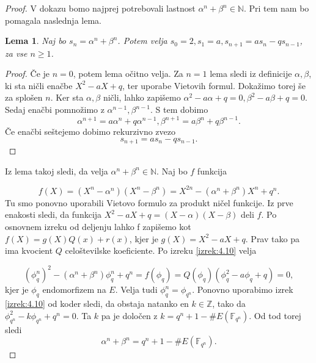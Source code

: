 \documentclass[12pt,a4paper,twoside]{article}
\theoremstyle{definition} %
\theoremstyle{plain} %
\newtheorem{lema}[definicija]{Lema}
\numberwithin{equation}{section}  %
\newcommand{\N}{\mathbb N}
\newcommand{\Z}{\mathbb Z}
\newcommand{\F}{\mathbb F}
\newcommand{\E}[1]{E({#1})}
\begin{document}
\begin{proof}
V dokazu bomo najprej potrebovali lastnost $\alpha^n+\beta^n \in \N$. Pri tem nam bo pomagala naslednja lema.


\begin{lema}
\label{lema:4.13}
Naj bo $s_n = \alpha^n +  \beta^n$. Potem velja $s_0 = 2,s_1 = a, s_{n+1} = as_n-qs_{n-1}$, za vse $n \geq 1$.

\end{lema}

\begin{proof}
Če je $n = 0$, potem lema očitno velja. Za $n=1$ lema sledi iz definicije $\alpha,\beta$, ki sta ničli enačbe $X^2-aX+q$, ter uporabe Vietovih formul. Dokažimo torej še za splošen $n$.
Ker sta $\alpha,\beta$ ničli, lahko zapišemo $\alpha^2-a\alpha +q = 0, \beta^2-a\beta+q=0$. Sedaj enačbi pomnožimo z $\alpha^{n-1},\beta^{n-1}$. S tem dobimo
$$\alpha^{n+1} = a\alpha^n +q\alpha^{n-1}, \beta^{n+1} = a\beta^n +q\beta^{n-1}.$$
Če enačbi seštejemo dobimo rekurzivno zvezo
$$s_{n+1} = as_n-qs_{n-1}.$$
\end{proof}

Iz lema takoj sledi, da velja $\alpha^n+\beta^n \in \N$. Naj bo $f$ funkcija

$$f(X) = (X^n-\alpha^n)(X^n-\beta^n) = X^{2n}-(\alpha^n+\beta^n)X^n+q^n.$$
Tu smo ponovno uporabili Vietovo formulo za produkt ničel funkcije. Iz prve enakosti sledi, da funkcija $X^2-aX+q = (X-\alpha)(X-\beta)$ deli $f$. Po osnovnem izreku od deljenju lahko f zapišemo kot $f(X) = g(X)Q(x)+r(x)$, kjer je $g(X)= X^2-aX+q$. Prav tako pa ima kvocient $Q$ celoštevilske koeficiente. Po izreku \ref{izrek:4.10} velja

$$(\phi^n_q)^2 -(\alpha^n+\beta^n)\phi^n_q + q^n = f(\phi_q) = Q(\phi_q)(\phi^2_q-a\phi_q+q) = 0,$$
kjer je $\phi_q$ endomorfizem na $E$. Velja tudi $\phi^n_q = \phi_{q^n}$. Ponovno uporabimo izrek \ref{izrek:4.10} od koder sledi, da obstaja natanko en $k \in \Z$, tako da 
$\phi^2_{q^n}-k\phi_{q^n}+q^n=0$. Ta $k$ pa je določen z $k = q^n+1-\#\E{\F_{q^n}}$. Od tod torej sledi
$$\alpha^n+\beta^n = q^n+1-\#\E{\F_{q^n}}.$$

\end{proof}
\end{document}
